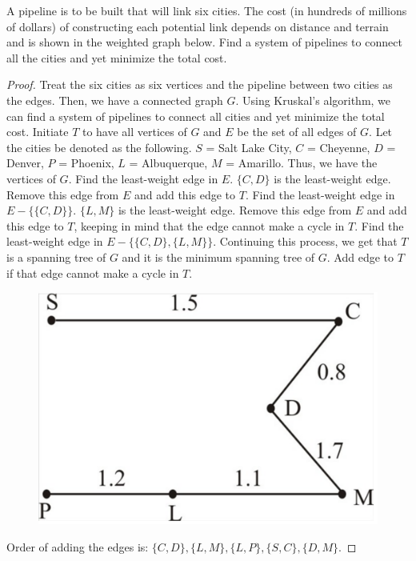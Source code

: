 \documentclass[14pt]{extarticle}
\begin{document}
A pipeline is to be built that will link six cities. The cost (in hundreds of millions of dollars) of constructing each potential link depends on distance and terrain and is shown in the weighted graph below. Find a system of pipelines to connect all the cities and yet minimize the total cost.

\begin{proof}
Treat the six cities as six vertices and the pipeline between two cities as the edges. Then, we have a connected graph 
\(G\). Using Kruskal's algorithm, we can find a system of pipelines to connect all cities and yet minimize the total 
cost. Initiate \(T\) to have all vertices of \(G\) and \(E\) be the set of all edges of \(G\). Let the cities be denoted as 
the following. \(S\) = Salt Lake City, \(C\) = Cheyenne, \(D\) = Denver, \(P\) = Phoenix, \(L\) = Albuquerque, \(M\) = 
Amarillo. Thus, we have the vertices of \(G\). Find the least-weight edge in \(E\). \(\{C, D\}\) is the least-weight edge. 
Remove this edge from \(E\) and add this edge to \(T\). Find the least-weight edge in \(E - \{\{C, D\}\}\). \(\{L, M\}\) is 
the least-weight edge. Remove this edge from \(E\) and add this edge to \(T\), keeping in mind that the edge cannot make 
a cycle in \(T\). Find the least-weight edge in \(E - \{\{C, D\}, \{L, M\}\}\). Continuing this process, we get that \(T\) 
is a spanning tree of \(G\) and it is the minimum spanning tree of \(G\). Add edge to \(T\) if that edge cannot make a 
cycle in \(T\).

\begin{figure}[ht!]
\centering
\includegraphics[scale=0.15]{../images/10.6.11.2.png}
\end{figure}

Order of adding the edges is: \(\{C, D\}, \{L, M\}, \{L, P\}, \{S, C\}, \{D, M\}\).
\end{proof}
\end{document}
